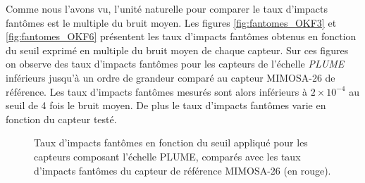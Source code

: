    \medskip
   
   Comme nous l'avons vu, l'unit\'e naturelle pour comparer le taux d'impacts fant\^omes est le multiple du bruit moyen. Les figures \ref{fig:fantomes_OKF3} et \ref{fig:fantomes_OKF6} pr\'esentent les taux d'impacts fant\^omes obtenus en fonction du seuil exprim\'e en multiple du bruit moyen de chaque capteur. Sur ces figures on observe des taux d'impacts fant\^omes pour les capteurs de l'\'echelle \textit{PLUME} inf\'erieurs jusqu'à un ordre de grandeur compar\'e au capteur MIMOSA-26 de r\'ef\'erence. Les taux d'impacts fant\^omes mesur\'es sont alors inf\'erieurs \`a $2 \times 10^{-4}$ au seuil de 4 fois le bruit moyen. De plus le taux d'impacts fant\^omes varie en fonction du capteur test\'e. 
   
   \medskip
   
 
  \begin{figure}[htb!]
     \begin{center}
     \end{center}
     \caption{Taux d'impacts fant\^omes en fonction du seuil appliqu\'e pour les capteurs composant l'\'echelle PLUME, compar\'es avec les taux d'impacts fant\^omes du capteur de r\'ef\'erence MIMOSA-26 (en rouge).}
     \label{fig:fantomes_PLUME}
   \end{figure} 

